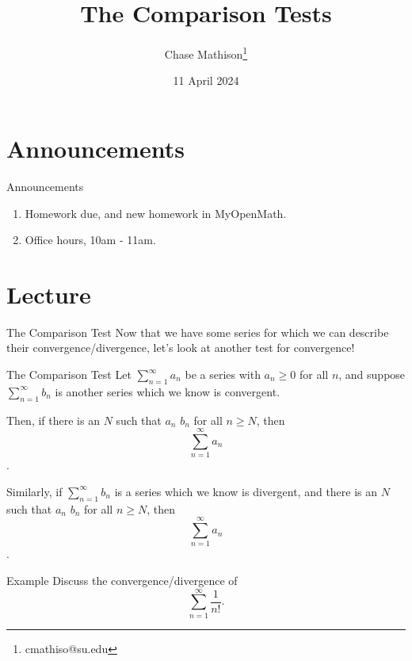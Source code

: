 \documentclass[presentation]{beamer}
\institute[SU]{Shenandoah University}
\author{Chase Mathison\thanks{cmathiso@su.edu}}
\date{11 April 2024}
\title{The Comparison Tests}
\begin{document}
\maketitle

\section{Announcements}
\label{sec:orge345e4c}
\begin{frame}[label={sec:org453fc95}]{Announcements}
\begin{enumerate}
\item Homework due, and new homework in MyOpenMath.
\item Office hours, 10am - 11am.
\end{enumerate}
\end{frame}

\section{Lecture}
\label{sec:orge41902b}
\begin{frame}[label={sec:org58cf061}]{The Comparison Test}
Now that we have some series for which we can describe their
convergence/divergence, let's look at another test for convergence!
\end{frame}

\begin{frame}[label={sec:orgac27d25}]{The Comparison Test}
Let \(\sum\limits_{n=1}^{\infty} a_n\) be a series with \(a_n \ge 0\) for all \(n\), and suppose
\(\sum\limits_{n=1}^{\infty} b_n\) is another series which we know is convergent.

Then, if there is an \(N\) such that \(a_n\) \uline{\hspace*{0.25in}} \(b_n\) for all \(n \ge N\), then
\[
\sum\limits_{n=1}^{\infty} a_n\]
\uline{\hspace*{1in}}.

Similarly, if \(\sum\limits_{n=1}^{\infty} b_n\) is a series which we know is divergent,
and there is an \(N\) such that \(a_n\) \uline{\hspace*{0.25in}} \(b_n\) for all \(n \ge N\), then
\[
\sum\limits_{n=1}^{\infty} a_n\]
\uline{\hspace*{1in}}.
\end{frame}

\begin{frame}[label={sec:org1530b07}]{Example}
Discuss the convergence/divergence of
\[
\sum\limits_{n=1}^{\infty} \frac{1}{n!}.\]
\vspace{10in}
\end{frame}
\end{document}
